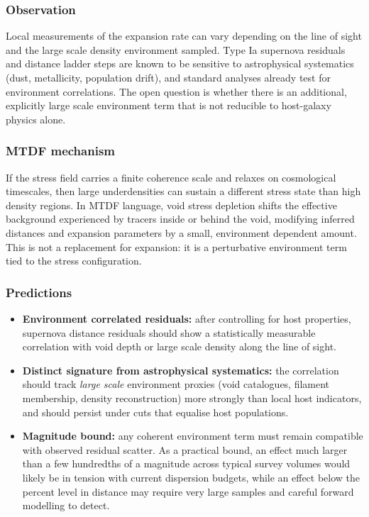 \documentclass[11pt,a4paper]{article}
\begin{document}
\subsubsection{Observation}
Local measurements of the expansion rate can vary depending on the line of sight and the large scale density environment sampled. 
Type Ia supernova residuals and distance ladder steps are known to be sensitive to astrophysical systematics (dust, metallicity, population drift), 
and standard analyses already test for environment correlations. The open question is whether there is an additional, explicitly large scale 
environment term that is not reducible to host-galaxy physics alone.

\subsubsection{MTDF mechanism}
If the stress field carries a finite coherence scale and relaxes on cosmological timescales, then large underdensities can sustain a different stress state 
than high density regions. In MTDF language, void stress depletion shifts the effective background experienced by tracers inside or behind the void, 
modifying inferred distances and expansion parameters by a small, environment dependent amount. This is not a replacement for expansion: it is a perturbative 
environment term tied to the stress configuration.

\subsubsection{Predictions}
\begin{itemize}
  \item \textbf{Environment correlated residuals:} after controlling for host properties, supernova distance residuals should show a statistically measurable correlation with void depth or large scale density along the line of sight.
  \item \textbf{Distinct signature from astrophysical systematics:} the correlation should track \emph{large scale} environment proxies (void catalogues, filament membership, density reconstruction) more strongly than local host indicators, and should persist under cuts that equalise host populations.
  \item \textbf{Magnitude bound:} any coherent environment term must remain compatible with observed residual scatter. As a practical bound, an effect much larger than a few hundredths of a magnitude across typical survey volumes would likely be in tension with current dispersion budgets, while an effect below the percent level in distance may require very large samples and careful forward modelling to detect.
\end{itemize}
\end{document}
